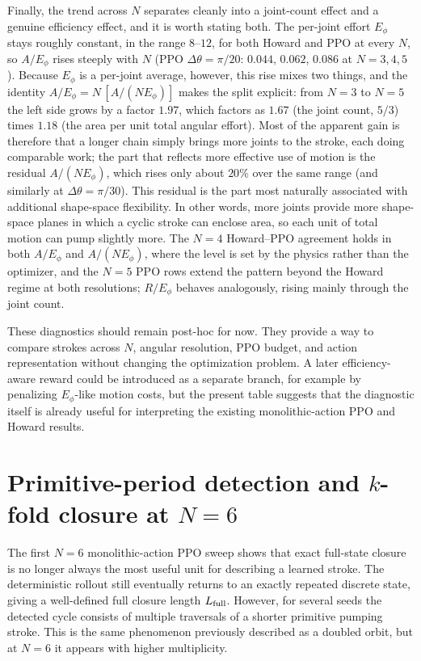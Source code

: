 \documentclass[11pt]{article}
\begin{document}
Finally, the trend across $N$ separates cleanly into a joint-count effect and a genuine efficiency effect, and it is worth stating both. The per-joint effort $E_\phi$ stays roughly constant, in the range $8$--$12$, for both Howard and PPO at every $N$, so $A/E_\phi$ rises steeply with $N$ (PPO $\Delta\theta=\pi/20$: $0.044$, $0.062$, $0.086$ at $N=3,4,5$). Because $E_\phi$ is a per-joint average, however, this rise mixes two things, and the identity $A/E_\phi = N\,[A/(N E_\phi)]$ makes the split explicit: from $N=3$ to $N=5$ the left side grows by a factor $1.97$, which factors as $1.67$ (the joint count, $5/3$) times $1.18$ (the area per unit total angular effort). Most of the apparent gain is therefore that a longer chain simply brings more joints to the stroke, each doing comparable work; the part that reflects more effective use of motion is the residual $A/(N E_\phi)$, which rises only about $20\%$ over the same range (and similarly at $\Delta\theta=\pi/30$). This residual is the part most naturally associated with additional
shape-space flexibility. In other words, more joints provide more shape-space planes in which a cyclic stroke can enclose area, so each unit of total motion can pump slightly more. The $N=4$ Howard--PPO agreement holds in both $A/E_\phi$ and $A/(N E_\phi)$, where the level is set by the physics rather than the optimizer, and the $N=5$ PPO rows extend the pattern beyond the Howard regime at both resolutions; $R/E_\phi$ behaves analogously, rising mainly through the joint count.

These diagnostics should remain post-hoc for now. They provide a way to compare strokes across $N$, angular resolution, PPO budget, and action representation without changing the optimization problem. A later efficiency-aware reward could be introduced as a separate branch, for example by penalizing $E_\phi$-like motion costs, but the present table suggests that the diagnostic itself is already useful for interpreting the existing monolithic-action PPO and Howard results.

\section{Primitive-period detection and $k$-fold closure at $N=6$}

The first $N=6$ monolithic-action PPO sweep shows that exact full-state closure is no longer always the most useful unit for describing a learned stroke. The deterministic rollout still eventually returns to an exactly repeated discrete state, giving a well-defined full closure length $L_{\rm full}$. However, for several seeds the detected cycle consists of multiple traversals of a shorter primitive pumping stroke. This is the same phenomenon previously described as a doubled orbit, but at $N=6$ it appears with higher multiplicity.
\end{document}
